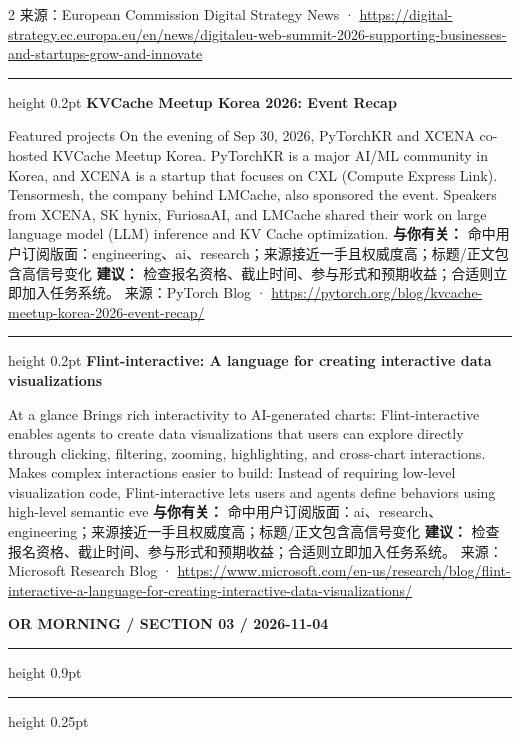 \documentclass[10.5pt]{ctexart}
\begin{document}
\begin{multicols}{2}
{\footnotesize\color{ormuted} 来源：European Commission Digital Strategy News · \url{https://digital-strategy.ec.europa.eu/en/news/digitaleu-web-summit-2026-supporting-businesses-and-startups-grow-and-innovate}}
\vspace{2mm}
\hrule height 0.2pt
\vspace{2mm}
{\large\bfseries KVCache Meetup Korea 2026: Event Recap}\par
Featured projects On the evening of Sep 30, 2026, PyTorchKR and XCENA co-hosted KVCache Meetup Korea. PyTorchKR is a major AI/ML community in Korea, and XCENA is a startup that focuses on CXL (Compute Express Link). Tensormesh, the company behind LMCache, also sponsored the event. Speakers from XCENA, SK hynix, FuriosaAI, and LMCache shared their work on large language model (LLM) inference and KV Cache optimization.
\textbf{与你有关：} 命中用户订阅版面：engineering、ai、research；来源接近一手且权威度高；标题/正文包含高信号变化
\textbf{建议：} 检查报名资格、截止时间、参与形式和预期收益；合适则立即加入任务系统。
{\footnotesize\color{ormuted} 来源：PyTorch Blog · \url{https://pytorch.org/blog/kvcache-meetup-korea-2026-event-recap/}}
\vspace{2mm}
\hrule height 0.2pt
\vspace{2mm}
{\large\bfseries Flint-interactive: A language for creating interactive data visualizations}\par
At a glance Brings rich interactivity to AI-generated charts: Flint-interactive enables agents to create data visualizations that users can explore directly through clicking, filtering, zooming, highlighting, and cross-chart interactions. Makes complex interactions easier to build: Instead of requiring low-level visualization code, Flint-interactive lets users and agents define behaviors using high-level semantic eve
\textbf{与你有关：} 命中用户订阅版面：ai、research、engineering；来源接近一手且权威度高；标题/正文包含高信号变化
\textbf{建议：} 检查报名资格、截止时间、参与形式和预期收益；合适则立即加入任务系统。
{\footnotesize\color{ormuted} 来源：Microsoft Research Blog · \url{https://www.microsoft.com/en-us/research/blog/flint-interactive-a-language-for-creating-interactive-data-visualizations/}}
\end{multicols}
\newpage
{\small\bfseries OR MORNING / SECTION 03 / 2026-11-04}
\vspace{2mm}
\hrule height 0.9pt
\vspace{1.5mm}
\hrule height 0.25pt
\vspace{4mm}
\end{document}
